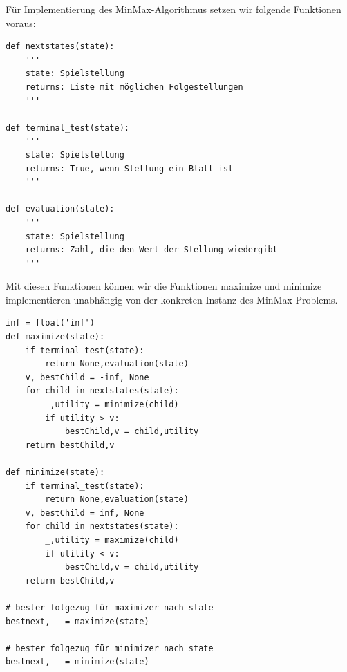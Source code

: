 \begin{frame}[fragile]
Für Implementierung des MinMax-Algorithmus setzen wir folgende Funktionen voraus:
\begin{lstlisting}[basicstyle=\tiny]
def nextstates(state):
    '''
    state: Spielstellung
    returns: Liste mit möglichen Folgestellungen
    '''

def terminal_test(state):
    '''
    state: Spielstellung
    returns: True, wenn Stellung ein Blatt ist
    '''

def evaluation(state):
    '''
    state: Spielstellung
    returns: Zahl, die den Wert der Stellung wiedergibt
    '''
\end{lstlisting} 
Mit diesen Funktionen können wir die Funktionen maximize und minimize implementieren unabhängig von 
der konkreten Instanz des MinMax-Problems.
\end{frame}

\begin{frame}[fragile]
\begin{lstlisting}[basicstyle=\tiny]
inf = float('inf')
def maximize(state):
    if terminal_test(state):
        return None,evaluation(state)
    v, bestChild = -inf, None
    for child in nextstates(state):
        _,utility = minimize(child)
        if utility > v:
            bestChild,v = child,utility
    return bestChild,v

def minimize(state):
    if terminal_test(state):
        return None,evaluation(state)
    v, bestChild = inf, None
    for child in nextstates(state):
        _,utility = maximize(child)
        if utility < v:
            bestChild,v = child,utility
    return bestChild,v

# bester folgezug für maximizer nach state
bestnext, _ = maximize(state)

# bester folgezug für minimizer nach state
bestnext, _ = minimize(state)
\end{lstlisting} 
\end{frame}

